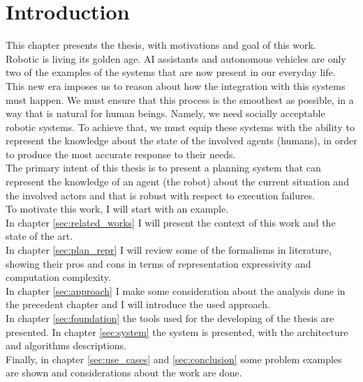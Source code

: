 \documentclass[pdftex,12pt,a4paper]{report}
\begin{document}


\newpage
\tableofcontents
\newpage

\chapter{Introduction}
This chapter presents the thesis, with motivations and goal of this work.\\
\newline
\noindent Robotic is living its golden age. AI assistants and autonomous vehicles are only two of the examples of the systems that are now present in our everyday life.
This new era imposes us to reason about how the integration with this systems must happen.
We must ensure that this process is the smoothest as possible, in a way that is natural for human beings.
Namely, we need socially acceptable robotic systems. To achieve that, we must equip these systems with the ability to represent the knowledge about the state of the involved agents (humans), in order to produce the most accurate response to their needs. \\

\noindent The primary intent of this thesis is to present a planning system that can represent the knowledge of an agent (the robot) about the current situation and the involved actors and that is robust with respect to execution failures. \\


\noindent To motivate this work, I will start with an example.\\
In chapter \ref{sec:related_works} I will present the context of this work and the state of the art.\\ 
In chapter \ref{sec:plan_repr} I will review some of the formalisms in literature, showing their pros and cons in terms of representation expressivity and computation complexity.\\ 
In chapter \ref{sec:approach} I make some consideration about the analysis done in the precedent chapter and I will introduce the used approach.\\ 
In chapter \ref{sec:foundation} the tools used for the developing of the thesis are presented. In chapter \ref{sec:system} the system is presented, with the architecture and algorithms descriptions.\\ 
Finally, in chapter \ref{sec:use_cases} and \ref{sec:conclusion} some problem examples are shown and considerations about the work are done.
\end{document}
